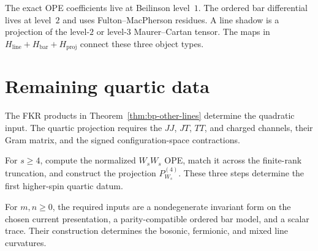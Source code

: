 \begin{remark}
\label{rem:extended-e1-ordered-provenance}
The exact OPE coefficients live at Beilinson level~$1$.  The ordered
bar differential lives at level~$2$ and uses Fulton--MacPherson
residues.  A line shadow is a projection of the level-$2$ or level-$3$
Maurer--Cartan tensor.  The maps in
$H_{\mathrm{line}}+H_{\mathrm{bar}}+H_{\mathrm{proj}}$ connect these
three object types.
\end{remark}

\section{Remaining quartic data}
\label{sec:extended-families-frontier}

\begin{remark}
\label{rem:bp-gpm-closed-form-open}
The FKR products in Theorem~\ref{thm:bp-other-lines} determine the
quadratic input.  The quartic projection requires the $JJ$, $JT$,
$TT$, and charged channels, their Gram matrix, and the signed
configuration-space contractions.
\end{remark}

\begin{remark}
\label{rem:w-infinity-higher-ws-open}
For $s\ge4$, compute the normalized $W_sW_s$ OPE, match it across the
finite-rank truncation, and construct the projection
$P_{W_s}^{(4)}$.  These three steps determine the first higher-spin
quartic datum.
\end{remark}

\begin{remark}
\label{rem:super-yangian-gl-mn-open}
For $m,n\ge0$, the required inputs are a nondegenerate invariant form
on the chosen current presentation, a parity-compatible ordered bar
model, and a scalar trace.  Their construction determines the
bosonic, fermionic, and mixed line curvatures.
\end{remark}
